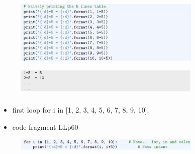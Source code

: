 \documentclass[english,14pt]{beamer}
\begin{document}

\begin{frame}[fragile]

\frametitle{}

\begin{figure}[ht]
	\centering
	\includegraphics[width=0.8\textwidth]{figures/LLp59}
\end{figure}

\begin{figure}[ht]
	\centering
	\includegraphics[width=0.8\textwidth]{figures/LLp60a}
\end{figure}
	
\end{frame}


\begin{frame}[fragile]

\frametitle{}

\begin{itemize}
	\item first loop for i in [1, 2, 3, 4, 5, 6, 7, 8, 9, 10]:
	\item code fragment LLp60
\end{itemize}

\begin{figure}[ht]
	\centering
	\includegraphics[width=0.8\textwidth]{figures/LLp60b}
\end{figure}


\end{frame}
\end{document}
